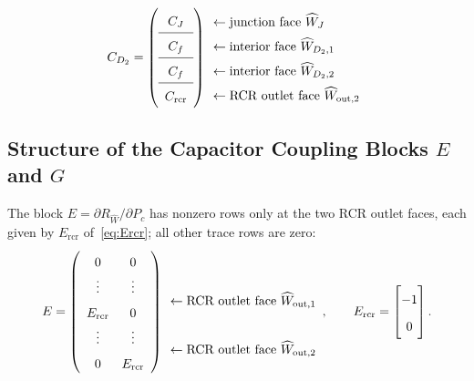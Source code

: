 \documentclass[11pt]{article}
\begin{document}
\begin{equation}
C_{D_2}
=
\renewcommand{\arraystretch}{1.6}
\left(
\begin{array}{c}
C_{J}            \\
\hline
C_{f}            \\
\hline
C_{f}            \\
\hline
C_{\mathrm{rcr}}
\end{array}
\right)
\begin{array}{l}
\leftarrow \text{junction face } \widehat{W}_{J}             \\
\leftarrow \text{interior face } \widehat{W}_{D_2,1}         \\
\leftarrow \text{interior face } \widehat{W}_{D_2,2}         \\
\leftarrow \text{RCR outlet face } \widehat{W}_{\mathrm{out},2}
\end{array}
\label{eq:CD2}
\end{equation}

\subsection{Structure of the Capacitor Coupling Blocks $E$ and $G$}

The block $E=\partial R_{\widehat{W}}/\partial P_c$ has nonzero rows only at
the two RCR outlet faces, each given by $E_{\mathrm{rcr}}$
of~\eqref{eq:Ercr}; all other trace rows are zero:
\begin{equation}
E
=
\renewcommand{\arraystretch}{1.6}
\left(
\begin{array}{cc}
0              & 0              \\
\vdots         & \vdots         \\
E_{\mathrm{rcr}} & 0            \\
\vdots         & \vdots         \\
0              & E_{\mathrm{rcr}}
\end{array}
\right)
\begin{array}{l}
\\
\leftarrow \text{RCR outlet face } \widehat{W}_{\mathrm{out},1}\\
\\
\leftarrow \text{RCR outlet face } \widehat{W}_{\mathrm{out},2}
\end{array},
\qquad
E_{\mathrm{rcr}}
=
\begin{bmatrix}-1\\[2pt]0\end{bmatrix}.
\label{eq:E_block}
\end{equation}
\end{document}
